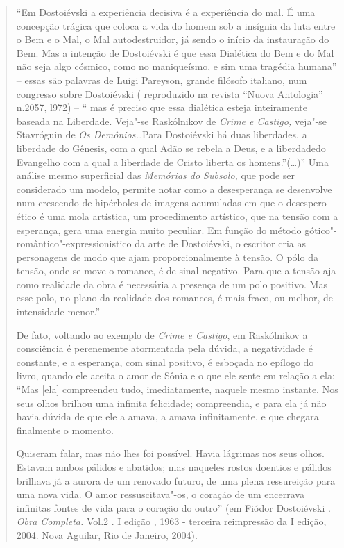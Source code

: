 \begin{quote}
``Em Dostoiévski a experiência decisiva é a experiência do mal. É uma
concepção trágica que coloca a vida do homem sob a insígnia da luta
entre o Bem e o Mal, o Mal autodestruidor, já sendo o início da
instauração do Bem. Mas a intenção de Dostoiévski é que essa Dialética
do Bem e do Mal não seja algo cósmico, como no maniqueísmo, e sim uma
tragédia humana'' -- essas são palavras de Luigi Pareyson, grande
filósofo italiano, num congresso sobre Dostoiévski ( reproduzido na
revista ``Nuova Antologia'' n.2057, l972) -- `` mas é preciso que essa
dialética esteja inteiramente baseada na Liberdade. Veja"-se Raskólnikov
de \emph{Crime e Castigo,} veja"-se Stavróguin de \emph{Os
Demônios\ldots{}}Para Dostoiévski há duas liberdades, a liberdade do Gênesis,
com a qual Adão se rebela a Deus, e a liberdadedo Evangelho com a qual a
liberdade de Cristo liberta os homens.''(\ldots{})'' Uma análise mesmo
superficial das \emph{Memórias do Subsolo,} que pode ser considerado um
modelo, permite notar como a desesperança se desenvolve num crescendo de
hipérboles de imagens acumuladas em que o desespero ético é uma mola
artística, um procedimento artístico, que na tensão com a esperança,
gera uma energia muito peculiar. Em função do método
gótico"-romântico"-expressionistico da arte de Dostoiévski, o escritor
cria as personagens de modo que ajam proporcionalmente à tensão. O pólo
da tensão, onde se move o romance, é de sinal negativo. Para que a
tensão aja como realidade da obra é necessária a presença de um polo
positivo. Mas esse polo, no plano da realidade dos romances, é mais
fraco, ou melhor, de intensidade menor.''

De fato, voltando ao exemplo de \emph{Crime e Castigo}, em Raskólnikov a
consciência é perenemente atormentada pela dúvida, a negatividade é
constante, e a esperança, com sinal positivo, é esboçada no epílogo do
livro, quando ele aceita o amor de Sônia e o que ele sente em relação a
ela: ``Mas {[}ela{]} compreendeu tudo, imediatamente, naquele mesmo
instante. Nos seus olhos brilhou uma infinita felicidade; compreendia, e
para ela já não havia dúvida de que ele a amava, a amava infinitamente,
e que chegara finalmente o momento.

Quiseram falar, mas não lhes foi possível. Havia lágrimas nos seus
olhos. Estavam ambos pálidos e abatidos; mas naqueles rostos doentios e
pálidos brilhava já a aurora de um renovado futuro, de uma plena
ressureição para uma nova vida. O amor ressuscitava"-os, o coração de um
encerrava infinitas fontes de vida para o coração do outro'' (em Fiódor
Dostoiévski . \emph{Obra Completa.} Vol.2 . I edição , 1963 - terceira
reimpressão da I edição, 2004. Nova Aguilar, Rio de Janeiro, 2004).


\end{quote}
